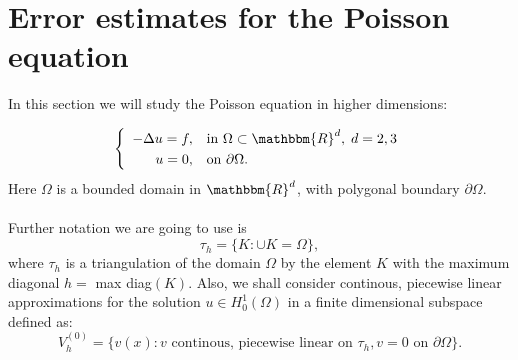 \documentclass[12pt, a4paper]{article}
\newcommand{\R}{\ensuremath{\mathbbm{R}}}
\numberwithin{equation}{section}
\begin{document}
\section{Error estimates for the Poisson equation}
In this section we will study the Poisson equation in higher dimensions:

\begin{equation}
\label{pois}
\left\{ \begin{array}{l}
\begin{split}
-\Delta u = f, \quad &\text{in } \Omega\subset \R^d,\; d=2,3 \\
u = 0, \quad &\text{on } \partial\Omega.
\end{split}
\end{array}\right.
\end{equation}
Here $\Omega$ is a bounded domain in $\R^d$, with polygonal boundary $\partial\Omega$.
\\\\
Further notation we are going to use is
\begin{equation*}
\tau_h = \{K : \cup K = \Omega\},
\end{equation*}
where $\tau_h$ is a triangulation of the domain $\Omega$ by the element $K$ with the maximum diagonal $h =$ max diag$(K)$. Also, we shall consider continous, piecewise linear approximations for the solution $u\in H_0^1(\Omega)$ in a finite dimensional subspace defined as:
\begin{equation*}
V_h^{(0)} = \{ v(x) : v \text{ continous, piecewise linear on } \tau_h, v=0 \text{ on } \partial\Omega \}.
\end{equation*}
\end{document}

